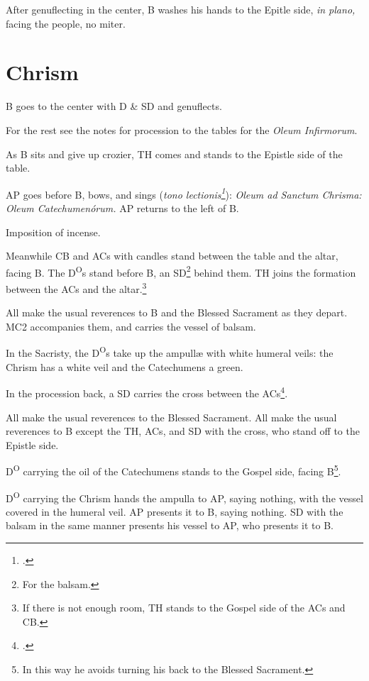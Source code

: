 {\rubric After genuflecting in the center, B washes his hands to the Epitle
side, \textit{in plano,} facing the people, no miter.

\section{Chrism}

\rubric B goes to the center with D \& SD and genuflects.

\rubric For the rest see the notes for procession to the tables for the
\textit{Oleum Infirmorum}.%

\rubric As B sits and give up crozier, TH comes and stands to the Epistle side
of the table.

\rubric AP goes before B, bows, and sings (\textit{tono lectionis\footcite[p.
186]{stehle}}): \textit{Oleum ad Sanctum Chrisma: Oleum Catechumenórum.} AP
returns to the left of B.

\rubric Imposition of incense.

\rubric Meanwhile CB and ACs with candles stand between the table and the
altar, facing B. The D\textsuperscript{O}s stand before B, an SD\footnote{For
the balsam.} behind them. TH joins the formation between the ACs and the
altar.\footnote{If there is not enough room, TH stands to the Gospel side of
the ACs and CB.}

\rubric All make the usual reverences to B and the Blessed Sacrament as they
depart. MC2 accompanies them, and carries the vessel of balsam.

\rubric In the Sacristy, the D\textsuperscript{O}s take up the ampullæ with
white humeral veils: the Chrism has a white veil and the Catechumens a green.

\rubric In the procession back, a SD carries the cross between the
ACs\footcite[p. 187]{stehle}.

\rubric All make the usual reverences to the Blessed Sacrament. All make the
usual reverences to B except the TH, ACs, and SD with the cross, who stand off
to the Epistle side.

\rubric D\textsuperscript{O} carrying the oil of the Catechumens stands to the
Gospel side, facing B\footnote{In this way he avoids turning his back to the
Blessed Sacrament.}.

\rubric D\textsuperscript{O} carrying the Chrism hands the ampulla to AP,
saying nothing, with the vessel covered in the humeral veil. AP presents it to
B, saying nothing. SD with the balsam in the same manner presents his vessel to
AP, who presents it to B.

}
